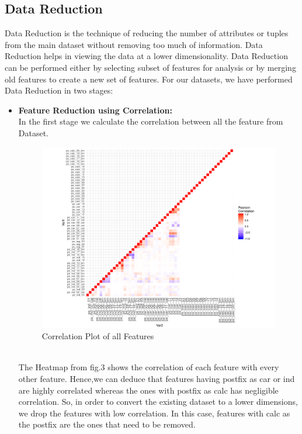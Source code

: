 \documentclass[fleqn,10pt]{SelfArx} %
\begin{document}
\subsection{Data Reduction}
Data Reduction is the technique of reducing the number of attributes or tuples from the main dataset without removing too much of information. Data Reduction helps in viewing the data at a lower dimensionality. Data Reduction can be performed either by selecting subset of features for analysis or by merging old features to create a new set of features. For our datasets, we have performed Data Reduction in two stages: 
\begin{itemize}
	
	\item{\textbf{Feature Reduction using Correlation:}}\\
	In the first stage we calculate the correlation between all the feature from Dataset.
	\begin{figure}[h]
	\includegraphics[width=1.1\columnwidth]{plots/corr_heat_map.pdf}\centering
	\caption{Correlation Plot of all Features}
	\end{figure}
	\\
	The Heatmap from fig.3 shows the correlation of each feature with every other feature. Hence,we can deduce that features having postfix as car or ind are highly correlated  whereas the ones with postfix as calc has negligible correlation\cite{1}. So, in order to convert the existing dataset to a lower dimensions, we drop the features with low correlation. In this case, features with calc as the postfix are the ones that need to be removed.


\end{itemize}
\end{document}
